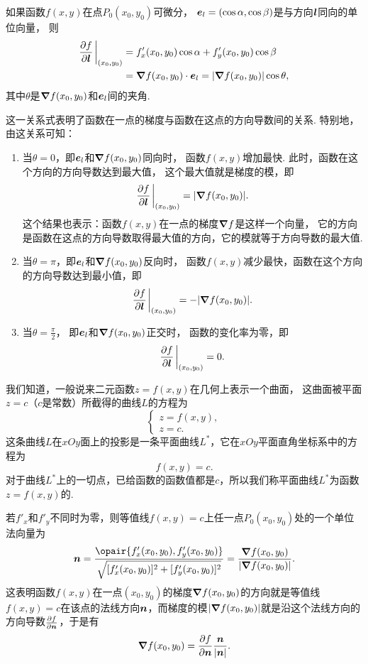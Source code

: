 \begin{theorem}\label{theorem:多元函数微分法.方向导数与梯度的关系}
如果函数\(f(x,y)\)在点\(P_0(x_0,y_0)\)可微分，
\(\boldsymbol{e}_l=(\cos\alpha,\cos\beta)\)是与方向\(\boldsymbol{l}\)同向的单位向量，
则\begin{equation}
	\begin{split}
		\pdv{f}{\vb{l}}\eval_{(x_0,y_0)}
		&= f'_x(x_0,y_0) \cos\alpha + f'_y(x_0,y_0) \cos\beta \\
		&= \grad f(x_0,y_0) \cdot \vb{e}_l
		= \abs{\grad f(x_0,y_0)} \cos\theta,
	\end{split}
\end{equation}
其中\(\theta\)是\(\grad f(x_0,y_0)\)和\(\boldsymbol{e}_l\)间的夹角.
\end{theorem}
这一关系式表明了函数在一点的梯度与函数在这点的方向导数间的关系.
特别地，由这关系可知：
\begin{enumerate}
	\item 当\(\theta=0\)，即\(\boldsymbol{e}_l\)和\(\grad f(x_0,y_0)\)同向时，
	函数\(f(x,y)\)增加最快.
	此时，函数在这个方向的方向导数达到最大值，
	这个最大值就是梯度的模，即\[
		\pdv{f}{\vb{l}}\eval_{(x_0,y_0)} = \abs{\grad f(x_0,y_0)}.
	\]
	这个结果也表示：函数\(f(x,y)\)在一点的梯度\(\grad f\)是这样一个向量，
	它的方向是函数在这点的方向导数取得最大值的方向，它的模就等于方向导数的最大值.

	\item 当\(\theta=\pi\)，即\(\boldsymbol{e}_l\)和\(\grad f(x_0,y_0)\)反向时，
	函数\(f(x,y)\)减少最快，函数在这个方向的方向导数达到最小值，即\[
		\pdv{f}{\vb{l}}\eval_{(x_0,y_0)} = -\abs{\grad f(x_0,y_0)}.
	\]

	\item 当\(\theta=\frac{\pi}{2}\)，
	即\(\boldsymbol{e}_l\)和\(\grad f(x_0,y_0)\)正交时，
	函数的变化率为零，即\[
		\pdv{f}{\vb{l}}\eval_{(x_0,y_0)} = 0.
	\]
\end{enumerate}

我们知道，一般说来二元函数\(z = f(x,y)\)在几何上表示一个曲面，
这曲面被平面\(z = c\)（\(c\)是常数）所截得的曲线\(L\)的方程为\[
\left\{ \begin{array}{l}
z = f(x,y), \\
z = c.
\end{array} \right.
\]这条曲线\(L\)在\(xOy\)面上的投影是一条平面曲线\(L^*\)，它在\(xOy\)平面直角坐标系中的方程为\[
f(x,y) = c.
\]对于曲线\(L^*\)上的一切点，已给函数的函数值都是\(c\)，所以我们称平面曲线\(L^*\)为函数\(z = f(x,y)\)的.

若\(f'_x\)和\(f'_y\)不同时为零，则等值线\(f(x,y) = c\)上任一点\(P_0(x_0,y_0)\)处的一个单位法向量为\[
\vb{n}
= \frac{\opair{f'_x(x_0,y_0),f'_y(x_0,y_0)}}{\sqrt{[f'_x(x_0,y_0)]^2+[f'_y(x_0,y_0)]^2}}
= \frac{\grad f(x_0,y_0)}{\abs{\grad f(x_0,y_0)}}.
\]
这表明函数\(f(x,y)\)在一点\((x_0,y_0)\)的梯度\(\grad f(x_0,y_0)\)的方向就是等值线\(f(x,y) = c\)在该点的法线方向\(\boldsymbol{n}\)，而梯度的模\(\abs{\grad f(x_0,y_0)}\)就是沿这个法线方向的方向导数\(\pdv{f}{\boldsymbol{n}}\)，于是有\[
\grad f(x_0,y_0) = \pdv{f}{\boldsymbol{n}} \frac{\boldsymbol{n}}{\abs{\boldsymbol{n}}}.
\]

